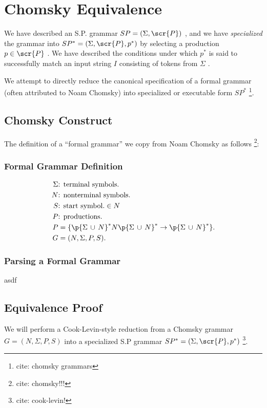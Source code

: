 \documentclass[10pt]{article}
\newcommand{\todocite}[1]{\footnote{cite: #1}}
\begin{document}
\section{Chomsky Equivalence}
\label{sec:chomsky-equivalence}
We have described an S.P. grammar $SP = (\Sigma, \scr{P})$ , and we have \textit{specialized} the grammar into $SP^* = (\Sigma, \scr{P}, p^*)$ by selecting a production $p \in \scr{P}$ . We have described the conditions under which $p^*$ is said to successfully match an input string $I$ consisting of tokens from $\Sigma$ .

We attempt to directly reduce the canonical specification of a formal grammar (often attributed to Noam Chomsky) into specialized or executable form $SP^*$ \todocite{chomsky grammars}.

\subsection{Chomsky Construct}
\label{sec:chomsky-construct}
The definition of a ``formal grammar'' we copy from Noam Chomsky as follows \todocite{chomsky!!!}:

\subsubsection{Formal Grammar Definition}
\label{sec:formal-grammar-definition}
\begin{align}
  \label{eq:chomsky-production}
  \Sigma &\text{: terminal symbols.} \\
  N &\text{: nonterminal symbols.} \\
  S &\text{: start symbol.} \in N \\
  P &\text{: productions.} \\
  P &= \{\p{\Sigma\, \cup \, N}^* N \p{\Sigma\, \cup \, N}^* \rightarrow \p{\Sigma\, \cup \, N}^* \}. \\
  G &= (N, \Sigma, P, S).
\end{align}

\subsubsection{Parsing a Formal Grammar}
\label{sec:parsing-a-formal-grammar}
asdf

\subsection{Equivalence Proof}
\label{sec:equivalence-proof}
We will perform a Cook-Levin-style reduction from a Chomsky grammar $G = (N, \Sigma, P, S)$  into a specialized S.P grammar $SP^* = (\Sigma, \scr{P}, p^*)$  \todocite{cook-levin!}.
\end{document}
